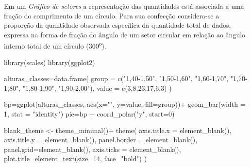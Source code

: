 \documentclass[
]{book}
\newenvironment{Shaded}{\begin{snugshade}}{\end{snugshade}}
\newcommand{\AttributeTok}[1]{\textcolor[rgb]{0.77,0.63,0.00}{#1}}
\newcommand{\DecValTok}[1]{\textcolor[rgb]{0.00,0.00,0.81}{#1}}
\newcommand{\FunctionTok}[1]{\textcolor[rgb]{0.00,0.00,0.00}{#1}}
\newcommand{\NormalTok}[1]{#1}
\newcommand{\OtherTok}[1]{\textcolor[rgb]{0.56,0.35,0.01}{#1}}
\newcommand{\SpecialCharTok}[1]{\textcolor[rgb]{0.00,0.00,0.00}{#1}}
\newcommand{\StringTok}[1]{\textcolor[rgb]{0.31,0.60,0.02}{#1}}
\begin{document}
\hfill\break

Em um \emph{Gráfico de setores} a representação das quantidades está associada a uma fração do comprimento de um círculo. Para sua confecção considera-se a proporção da quantidade observada específica da quantidade total de dados, expressa na forma de fração do ângulo de um setor circular em relação ao ângulo interno total de um círculo (360\textsuperscript{o}).

\hfill\break

\begin{Shaded}
\begin{Highlighting}[]
\FunctionTok{library}\NormalTok{(scales)}
\FunctionTok{library}\NormalTok{(ggplot2)}

\NormalTok{alturas\_classes}\OtherTok{=}\FunctionTok{data.frame}\NormalTok{(}
  \AttributeTok{group =} \FunctionTok{c}\NormalTok{(}\StringTok{"1,40{-}1,50"}\NormalTok{,}
            \StringTok{"1,50{-}1,60"}\NormalTok{,}
            \StringTok{"1,60{-}1,70"}\NormalTok{,}
            \StringTok{"1,70{-}1,80"}\NormalTok{,}
            \StringTok{"1,80{-}1,90"}\NormalTok{,}
            \StringTok{"1,90{-}2,00"}\NormalTok{),}
  \AttributeTok{value =} \FunctionTok{c}\NormalTok{(}\DecValTok{3}\NormalTok{,}\DecValTok{8}\NormalTok{,}\DecValTok{23}\NormalTok{,}\DecValTok{17}\NormalTok{,}\DecValTok{6}\NormalTok{,}\DecValTok{3}\NormalTok{)}
\NormalTok{)}

\NormalTok{bp}\OtherTok{=}\FunctionTok{ggplot}\NormalTok{(alturas\_classes, }\FunctionTok{aes}\NormalTok{(}\AttributeTok{x=}\StringTok{""}\NormalTok{, }\AttributeTok{y=}\NormalTok{value, }\AttributeTok{fill=}\NormalTok{group))}\SpecialCharTok{+}
  \FunctionTok{geom\_bar}\NormalTok{(}\AttributeTok{width =} \DecValTok{1}\NormalTok{, }\AttributeTok{stat =} \StringTok{"identity"}\NormalTok{)}
\NormalTok{pie}\OtherTok{=}\NormalTok{bp }\SpecialCharTok{+} \FunctionTok{coord\_polar}\NormalTok{(}\StringTok{"y"}\NormalTok{, }\AttributeTok{start=}\DecValTok{0}\NormalTok{)}

\NormalTok{blank\_theme }\OtherTok{\textless{}{-}} \FunctionTok{theme\_minimal}\NormalTok{()}\SpecialCharTok{+}
  \FunctionTok{theme}\NormalTok{(}
    \AttributeTok{axis.title.x =} \FunctionTok{element\_blank}\NormalTok{(),}
    \AttributeTok{axis.title.y =} \FunctionTok{element\_blank}\NormalTok{(),}
    \AttributeTok{panel.border =} \FunctionTok{element\_blank}\NormalTok{(),}
    \AttributeTok{panel.grid=}\FunctionTok{element\_blank}\NormalTok{(),}
    \AttributeTok{axis.ticks =} \FunctionTok{element\_blank}\NormalTok{(),}
    \AttributeTok{plot.title=}\FunctionTok{element\_text}\NormalTok{(}\AttributeTok{size=}\DecValTok{14}\NormalTok{, }\AttributeTok{face=}\StringTok{"bold"}\NormalTok{)}
\NormalTok{  )}


\end{Highlighting}
\end{Shaded}
\end{document}
